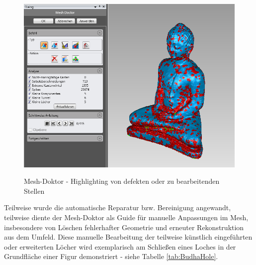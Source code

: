 \documentclass[]{article}
\begin{document}
\begin{figure}[H]
\caption{Mesh-Doktor - Highlighting von defekten oder zu bearbeitenden Stellen}
\centering
\includegraphics[scale=0.35]{images/GeoMagicBudhaPictures/Budha_MeshDoctor.PNG}
\label{fig:budhaMeshDoc}
\end{figure}

Teilweise wurde die automatische Reparatur bzw. Bereinigung angewandt, teilweise diente der Mesh-Doktor als Guide für manuelle Anpassungen im Mesh, insbesondere von Löschen fehlerhafter Geometrie und erneuter Rekonstruktion aus dem Umfeld. Diese manuelle Bearbeitung der teilweise künstlich eingeführten oder erweiterten Löcher wird exemplarisch am Schließen eines Loches in der Grundfläche einer Figur demonstriert - siehe Tabelle \ref{tab:BudhaHole}.
\end{document}
